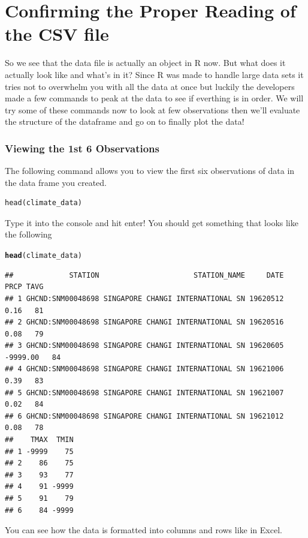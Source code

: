 \documentclass{article}\usepackage[]{graphicx}\usepackage[]{color}
\makeatletter
\newcommand{\hlstd}[1]{\textcolor[rgb]{0.345,0.345,0.345}{#1}}%
\newcommand{\hlkwd}[1]{\textcolor[rgb]{0.737,0.353,0.396}{\textbf{#1}}}%
\newenvironment{kframe}{%
 \def\at@end@of@kframe{}%
 \ifinner\ifhmode%
  \def\at@end@of@kframe{\end{minipage}}%
  \begin{minipage}{\columnwidth}%
 \fi\fi%
 \def\FrameCommand##1{\hskip\@totalleftmargin \hskip-\fboxsep
 \colorbox{shadecolor}{##1}\hskip-\fboxsep
     \hskip-\linewidth \hskip-\@totalleftmargin \hskip\columnwidth}%
 \MakeFramed {\advance\hsize-\width
   \@totalleftmargin\z@ \linewidth\hsize
   \@setminipage}}%
 {\par\unskip\endMakeFramed%
 \at@end@of@kframe}
\newenvironment{knitrout}{}{} %
\makeatother
\begin{document}
\section{Confirming the Proper Reading of the CSV file}


So we see that the data file is actually an object in R now. But what does it actually look like and what's in it? 
Since R was made to handle large data sets it tries not to overwhelm you with all the data at once but luckily the developers made a few commands to peak at the data to see if everthing is in order. We will try some of these commands now to look at few observations then we'll evaluate the structure of the dataframe and go on to finally plot the data!

\subsubsection{Viewing the 1st 6 Observations}
The following command allows you to view the first six observations of data in the data frame you created.
\begin{verbatim}
head(climate_data)
\end{verbatim}
Type it into the console and hit enter! You should get something that looks like the following

\begin{knitrout}
\color{fgcolor}\begin{kframe}
\begin{alltt}
\hlkwd{head}\hlstd{(climate_data)}
\end{alltt}
\begin{verbatim}
##             STATION                      STATION_NAME     DATE     PRCP TAVG
## 1 GHCND:SNM00048698 SINGAPORE CHANGI INTERNATIONAL SN 19620512     0.16   81
## 2 GHCND:SNM00048698 SINGAPORE CHANGI INTERNATIONAL SN 19620516     0.08   79
## 3 GHCND:SNM00048698 SINGAPORE CHANGI INTERNATIONAL SN 19620605 -9999.00   84
## 4 GHCND:SNM00048698 SINGAPORE CHANGI INTERNATIONAL SN 19621006     0.39   83
## 5 GHCND:SNM00048698 SINGAPORE CHANGI INTERNATIONAL SN 19621007     0.02   84
## 6 GHCND:SNM00048698 SINGAPORE CHANGI INTERNATIONAL SN 19621012     0.08   78
##    TMAX  TMIN
## 1 -9999    75
## 2    86    75
## 3    93    77
## 4    91 -9999
## 5    91    79
## 6    84 -9999
\end{verbatim}
\end{kframe}
\end{knitrout}
You can see how the data is formatted into columns and rows like in Excel. 
\end{document}
